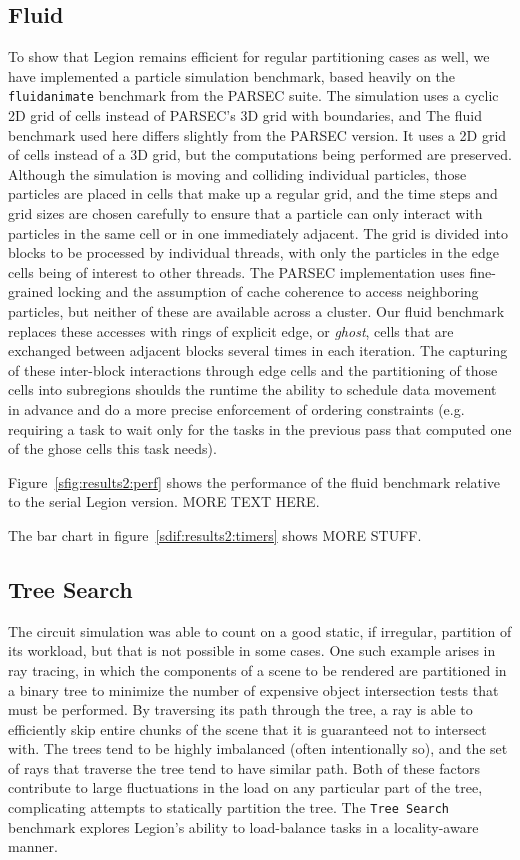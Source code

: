 \subsection{Fluid}

To show that Legion remains efficient for regular partitioning cases as well,
we have implemented a particle simulation benchmark, based heavily on the
{\tt fluidanimate} benchmark from the PARSEC suite.  The simulation uses a
cyclic 2D grid of cells instead of PARSEC's 3D grid with boundaries, and 
The fluid benchmark used here differs slightly from the PARSEC version.  It
uses a 2D grid of cells instead of a 3D grid, but the computations being 
performed are preserved.
Although the 
simulation is moving and colliding individual particles, those particles
are placed in cells that make up a regular grid, and the time steps and grid
sizes are chosen carefully to ensure that a particle can only interact with
particles in the same cell or in one immediately adjacent.  The grid is
divided into blocks to be processed by individual threads, with only the
particles in the edge cells being of interest to other threads.  The PARSEC
implementation uses fine-grained locking and the assumption of cache
coherence to access neighboring particles, but neither of these are available
across a cluster.  Our fluid benchmark replaces these accesses with rings of
explicit edge, or \emph{ghost}, cells that are exchanged between adjacent
blocks several times in each iteration.  The capturing of these inter-block
interactions through edge cells and the partitioning of those cells into
subregions shoulds the runtime the ability to schedule data movement in
advance and do a more precise enforcement of ordering constraints (e.g.
requiring a task to wait only for the tasks in the previous pass that computed
one of the ghose cells this task needs).

Figure~\ref{sfig:results2:perf} shows the performance of the fluid benchmark
relative to the serial Legion version.  MORE TEXT HERE.

The bar chart in figure~\ref{sdif:results2:timers} shows MORE STUFF.

\subsection{Tree Search}

The circuit simulation was able to count on a good static, if irregular,
partition of its workload, but that is not possible in some cases.  One
such example arises in ray tracing, in which the components of a scene to be
rendered are partitioned in a binary tree to minimize the number of expensive
object intersection tests that must be performed.  By traversing its path 
through the tree, a ray is able to efficiently skip entire chunks of the 
scene that it is guaranteed not to intersect with.  The trees tend to be
highly imbalanced (often intentionally so), and the set of rays that traverse
the tree tend to have similar path.  Both of these factors contribute to
large fluctuations in the load on any particular part of the tree, complicating
attempts to statically partition the tree.  The {\tt Tree Search} benchmark
explores Legion's ability to load-balance tasks in a locality-aware manner.

